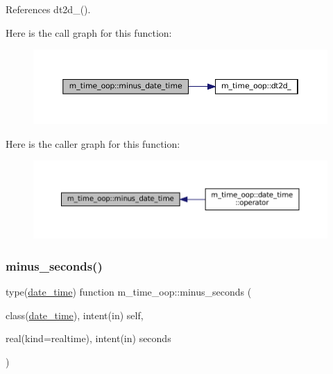 References dt2d\+\_\+().

Here is the call graph for this function\+:\nopagebreak
\begin{figure}[H]
\begin{center}
\leavevmode
\includegraphics[width=350pt]{namespacem__time__oop_a3da83a42a8f957db9bd2f6f0b942ab99_cgraph}
\end{center}
\end{figure}
Here is the caller graph for this function\+:\nopagebreak
\begin{figure}[H]
\begin{center}
\leavevmode
\includegraphics[width=350pt]{namespacem__time__oop_a3da83a42a8f957db9bd2f6f0b942ab99_icgraph}
\end{center}
\end{figure}
\mbox{\label{namespacem__time__oop_a395fbf19c6617641aea39c33fd4b2087}} 
\subsubsection{\texorpdfstring{minus\+\_\+seconds()}{minus\_seconds()}}
{\footnotesize\ttfamily type(\mbox{\hyperlink{structm__time__oop_1_1date__time}{date\+\_\+time}}) function m\+\_\+time\+\_\+oop\+::minus\+\_\+seconds (\begin{DoxyParamCaption}\item[{class(\mbox{\hyperlink{structm__time__oop_1_1date__time}{date\+\_\+time}}), intent(in)}]{self,  }\item[{real(kind=realtime), intent(in)}]{seconds }\end{DoxyParamCaption})\hspace{0.3cm}{\ttfamily [private]}}



